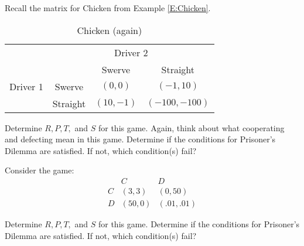 \begin{xca}\label{E:chickenshow}
Recall the matrix for Chicken from Example \ref{E:Chicken}.


\begin{table}[h]
\centering

\begin{tabular}{cccc}
                      & \multicolumn{3}{c}{Driver 2}                                                  \\ \cline{2-4} 
\multicolumn{1}{l|}{} & \multicolumn{1}{l|}{} & \multicolumn{1}{c|}{Swerve} & \multicolumn{1}{c|}{Straight} \\ \cline{2-4} 
\multicolumn{1}{l|}{Driver 1} & \multicolumn{1}{c|}{Swerve} & \multicolumn{1}{c|}{$(0, 0)$} & \multicolumn{1}{c|}{$(-1, 10)$} \\ \cline{2-4} 
\multicolumn{1}{l|}{} & \multicolumn{1}{c|}{Straight} & \multicolumn{1}{c|}{$(10, -1)$} & \multicolumn{1}{c|}{$(-100, -100)$} \\ \cline{2-4} 
\end{tabular}
\caption{Chicken (again)}
\end{table}

Determine $R, P, T,$ and $S$ for this game. Again, think about what cooperating and defecting mean in this game. Determine if the conditions for Prisoner's Dilemma are satisfied. If not, which condition(s) fail?
\end{xca}

\begin{xca}\label{E:conditionspractice1} 
Consider the game:
\[\begin{matrix}
& C& D\\
C& (3, 3) & (0, 50)\\
D &(50, 0) & (.01, .01)
\end{matrix}\]

Determine $R, P, T,$ and $S$ for this game. Determine if the conditions for Prisoner's Dilemma are satisfied. If not, which condition(s) fail?
\end{xca}

